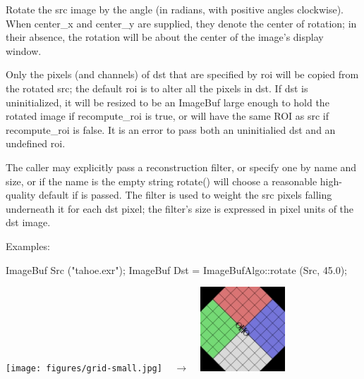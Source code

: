 Rotate the {\cf src} image by the {\cf angle} (in radians, with positive
angles clockwise). When {\cf center_x} and {\cf center_y} are supplied, they
denote the center of rotation; in their absence, the rotation will be about
the center of the image's display window.

Only the pixels (and channels) of {\cf dst} that are specified by {\cf roi}
will be copied from the rotated {\cf src}; the default {\cf roi} is to alter
all the pixels in {\cf dst}. If {\cf dst} is uninitialized, it will be
resized to be an ImageBuf large enough to hold the rotated image  if
{\cf recompute_roi} is {\cf true}, or will have the same ROI as {\cf src}
if {\cf recompute_roi} is false. It is an
error to pass both an uninitialied {\cf dst} and an undefined {\cf roi}.

The caller may explicitly pass a reconstruction filter, or specify one by
name and size, or if the name is the empty string {\cf rotate()} will choose
a reasonable high-quality default if \NULL is passed.  The filter is used to
weight the {\cf src} pixels falling underneath it for each {\cf dst} pixel;
the filter's size is expressed in pixel units of the {\cf dst} image.

\smallskip
\noindent Examples:
\begin{code}
    ImageBuf Src ("tahoe.exr");
    ImageBuf Dst = ImageBufAlgo::rotate (Src, 45.0);
\end{code}
\spc \texttt{[image: figures/grid-small.jpg]} 
~ {\Huge $\rightarrow$} ~
\includegraphics[width=1.25in]{figures/rotate45.jpg} \\
\apiend


